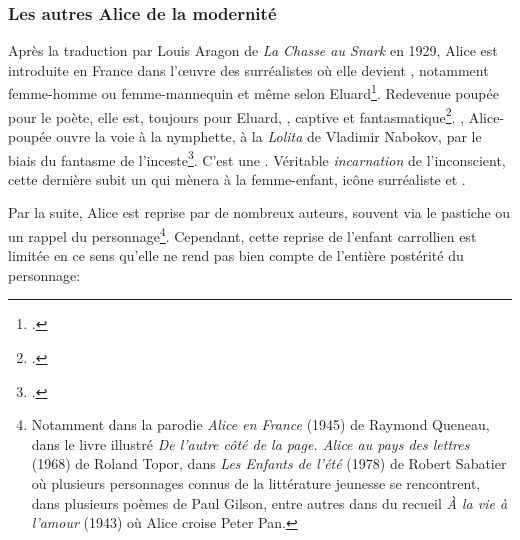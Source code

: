 \subsubsection{Les autres Alice de la modernité}
Après la traduction par Louis Aragon de \textit{La Chasse au Snark} en 1929, Alice est introduite en France dans l'\oe{}uvre des surréalistes où elle devient , notamment femme-homme ou femme-mannequin et même  selon Eluard\footcite[176]{Inglin-Routisseau2006}.
Redevenue poupée pour le poète, elle est, toujours pour Eluard, , captive et fantasmatique\footcite[285]{Inglin-Routisseau2006}. , Alice-poupée ouvre la voie à la nymphette, à la \textit{Lolita} de Vladimir Nabokov, par le biais du fantasme de l'inceste\footcite[287]{Inglin-Routisseau2006}.
C'est une .
Véritable \textit{incarnation} de l'inconscient, cette dernière subit un  qui mènera à la femme-enfant, icône surréaliste et .
\par
Par la suite, Alice est reprise par de nombreux auteurs, souvent via le pastiche ou un rappel du personnage\footnote{Notamment dans la parodie \textit{Alice en France} (1945) de Raymond Queneau, dans le livre illustré \textit{De l'autre côté de la page. Alice au pays des lettres} (1968) de Roland Topor, dans \textit{Les Enfants de l'été} (1978) de Robert Sabatier où plusieurs personnages connus de la littérature jeunesse se rencontrent, dans plusieurs poèmes de Paul Gilson, entre autres dans  du recueil \textit{À la vie à l'amour} (1943) où Alice croise Peter Pan.}.
Cependant, cette reprise de l'enfant carrollien est limitée en ce sens qu'elle ne rend pas bien compte de l'entière postérité du personnage: 





